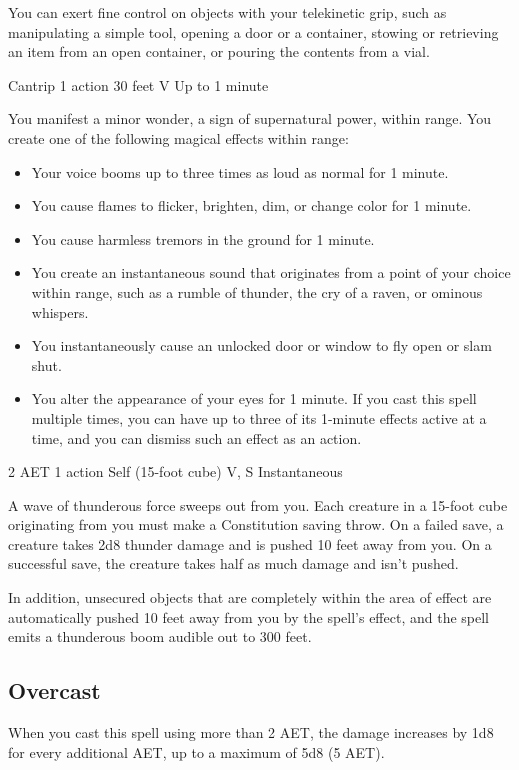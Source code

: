 You can exert fine control on objects with your telekinetic grip, such as manipulating a simple tool, opening a door or a container, stowing or retrieving an item from an open container, or pouring the contents from a vial.

{Cantrip}
{1 action}
{30 feet}
{V}
{Up to 1 minute}

You manifest a minor wonder, a sign of supernatural power, within range. You create one of the following magical effects within range:
\begin{itemize}
\item Your voice booms up to three times as loud as normal for 1 minute.
\item You cause flames to flicker, brighten, dim, or change color for 1 minute.
\item You cause harmless tremors in the ground for 1 minute.
\item You create an instantaneous sound that originates from a point of your choice within range, such as a rumble of thunder, the cry of a raven, or ominous whispers.
\item You instantaneously cause an unlocked door or window to fly open or slam shut.
\item You alter the appearance of your eyes for 1 minute. If you cast this spell multiple times, you can have up to three of its 1-minute effects active at a time, and you can dismiss such an effect as an action.
\end{itemize}

{2 AET}
{1 action}
{Self (15-foot cube)}
{V, S}
{Instantaneous}

A wave of thunderous force sweeps out from you. Each creature in a 15-foot cube originating from you must make a Constitution saving throw. On a failed save, a creature takes 2d8 thunder damage and is pushed 10 feet away from you. On a successful save, the creature takes half as much damage and isn't pushed.

In addition, unsecured objects that are completely within the area of effect are automatically pushed 10 feet away from you by the spell's effect, and the spell emits a thunderous boom audible out to 300 feet.

\subsection*{Overcast} When you cast this spell using more than 2 AET, the damage increases by 1d8 for every additional AET, up to a maximum of 5d8 (5 AET).

